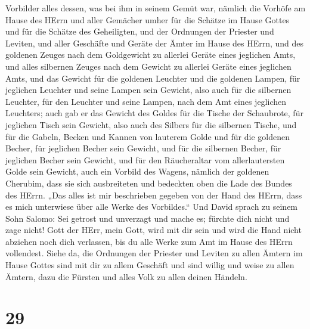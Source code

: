 Vorbilder alles dessen, was bei ihm in seinem Gemüt war, nämlich die
Vorhöfe am Hause des HErrn und aller Gemächer umher für die Schätze im
Hause Gottes und für die Schätze des Geheiligten,  und
der Ordnungen der Priester und Leviten, und aller Geschäfte und Geräte
der Ämter im Hause des HErrn,  und des goldenen Zeuges
nach dem Goldgewicht zu allerlei Geräte eines jeglichen Amts, und alles
silbernen Zeuges nach dem Gewicht zu allerlei Geräte eines jeglichen
Amts,  und das Gewicht für die goldenen Leuchter und die
goldenen Lampen, für jeglichen Leuchter und seine Lampen sein Gewicht,
also auch für die silbernen Leuchter, für den Leuchter und seine Lampen,
nach dem Amt eines jeglichen Leuchters;  auch gab er das
Gewicht des Goldes für die Tische der Schaubrote, für jeglichen Tisch
sein Gewicht, also auch des Silbers für die silbernen Tische,
 und für die Gabeln, Becken und Kannen von lauterem Golde
und für die goldenen Becher, für jeglichen Becher sein Gewicht, und für
die silbernen Becher, für jeglichen Becher sein Gewicht, 
und für den Räucheraltar vom allerlautersten Golde sein Gewicht, auch
ein Vorbild des Wagens, nämlich der goldenen Cherubim, dass sie sich
ausbreiteten und bedeckten oben die Lade des Bundes des HErrn.
 „Das alles ist mir beschrieben gegeben von der Hand des
HErrn, dass es mich unterwiese über alle Werke des Vorbildes.``
 Und David sprach zu seinem Sohn Salomo: Sei getrost und
unverzagt und mache es; fürchte dich nicht und zage nicht! Gott der
HErr, mein Gott, wird mit dir sein und wird die Hand nicht abziehen noch
dich verlassen, bis du alle Werke zum Amt im Hause des HErrn vollendest.
 Siehe da, die Ordnungen der Priester und Leviten zu
allen Ämtern im Hause Gottes sind mit dir zu allem Geschäft und sind
willig und weise zu allen Ämtern, dazu die Fürsten und alles Volk zu
allen deinen Händeln.

\hypertarget{section-28}{%
\section{29}\label{section-28}}

